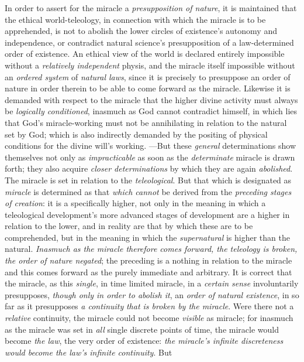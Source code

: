 \documentclass[12pt,a4paper]{book}
\begin{document}
In order to assert for the miracle a \emph{presupposition of nature}, it is maintained that the
ethical world-teleology, in connection with which the miracle is to be apprehended, is not
to abolish the lower circles of existence's autonomy and independence, or contradict
natural science's presupposition of a law-determined order of existence. An ethical view of
the world is declared entirely impossible without a \emph{relatively independent} physis, and the
miracle itself impossible without an \emph{ordered system} of \emph{natural laws}, since it is precisely
to presuppose an order of nature in order therein to be able to come forward as the miracle.
Likewise it is demanded with respect to the miracle that the higher divine activity must
always be \emph{logically conditioned}, inasmuch as God cannot contradict himself, in which lies
that God's miracle-working must not be annihilating in relation to the natural set by God;
which is also indirectly demanded by the positing of physical conditions for the divine
will's working. ---But these \emph{general} determinations show themselves not only as
\emph{impracticable} as soon as the \emph{determinate} miracle is drawn forth; they also acquire
\emph{closer determinations} by which they are again \emph{abolished}. The miracle is set in relation to
the \emph{teleological}. But that which is designated as \emph{miracle} is determined as that \emph{which cannot}
be derived from the \emph{preceding stages of creation}: it is a specifically higher, not only in
the meaning in which a teleological development's more advanced stages of development are a
higher in relation to the lower, and in reality are that by which these are to be
comprehended, but in the meaning in which the \emph{supernatural} is higher than the natural.
\emph{Inasmuch as the miracle therefore comes forward, the teleology is broken, the order of
nature negated}; the preceding is a nothing in relation to the miracle and this comes
forward as the purely immediate and arbitrary. It is correct that the miracle, as this
\emph{single}, in time limited miracle, in a \emph{certain sense} involuntarily presupposes, \emph{though
only in order to abolish it}, an \emph{order of natural existence}, in so far as it presupposes \emph{a
continuity} \emph{that is broken by the miracle}. Were there not a \emph{relative} continuity, the miracle
could not become \emph{visible} as miracle; for inasmuch as the miracle was set in \emph{all} single
discrete points of time, the miracle would become \emph{the law}, the very order of existence:
\emph{the miracle's infinite discreteness would become the law's infinite continuity}. But
\end{document}

